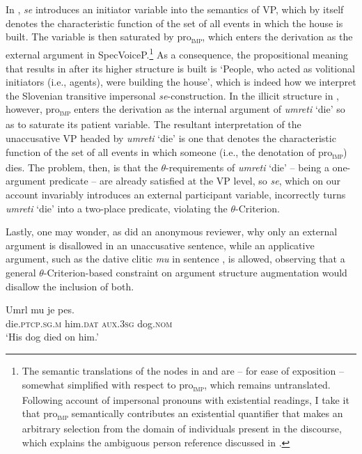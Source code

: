 \documentclass[output=paper,
modfonts,nonflat,
newtxmath
]{langsci/langscibook}
\begin{document}
\noindent In , \textit{se} introduces an initiator variable into the semantics of VP, which by itself denotes the characteristic function of the set of all events in which the house is built. The variable is then saturated by pro\textsubscript{\textsc{imp}}, which enters the derivation as the external argument in SpecVoiceP.\footnote{The semantic translations of the nodes in  and  are -- for ease of exposition -- somewhat simplified with respect to pro\textsubscript{\textsc{imp}}, which remains untranslated. Following  account of impersonal pronouns with existential readings, I take it that pro\textsubscript{\textsc{imp}} semantically contributes an existential quantifier that makes an arbitrary selection from the domain of individuals present in the discourse, which explains the ambiguous person reference discussed in .}  As a consequence, the propositional meaning that  results in after its higher structure is built is `People, who acted as volitional initiators (i.e., agents), were building the house', which is indeed how we interpret the Slovenian transitive impersonal \textit{se}-construction. In the illicit structure in , however, pro\textsubscript{\textsc{imp}} enters the derivation as the internal argument of \textit{umreti} `die' so as to saturate its patient variable. The resultant interpretation of the unaccusative VP headed by \textit{umreti} `die' is one that denotes the characteristic function of the set of all events in which someone (i.e., the denotation of pro\textsubscript{\textsc{imp}}) dies. The problem, then, is that the $\theta$-requirements of \textit{umreti} `die' – being a one-argument predicate – are already satisfied at the VP level, so \textit{se}, which on our account invariably introduces an external participant variable, incorrectly turns \textit{umreti} `die' into a two-place predicate, violating the $\theta$-Criterion. \par 
Lastly, one may wonder, as did an anonymous reviewer,  why only an external argument is disallowed in an unaccusative sentence, while an applicative argument, such as the dative clitic \textit{mu} in sentence , is allowed, observing that a general  $\theta$-Criterion-based constraint on argument structure augmentation would disallow the inclusion of both.

\begin{exe}
\ex \label{ummu} \gll Umrl mu je pes.\\
die.\textsc{ptcp.sg.m} him.\textsc{dat} \textsc{aux}.\textsc{3sg} dog.\textsc{nom}\\
\trans `His dog died on him.'
\end{exe}
\end{document}
